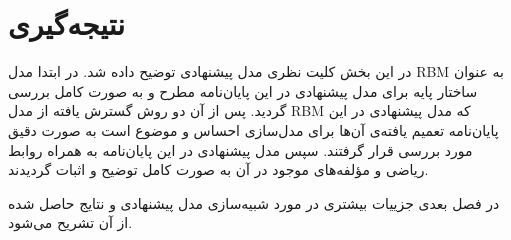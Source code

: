 \section{نتیجه‌گیری}
در این بخش کلیت نظری مدل پیشنهادی توضیح داده شد. در ابتدا مدل
RBM
به عنوان ساختار پایه برای مدل پیشنهادی در این پایان‌‌نامه مطرح و به صورت کامل بررسی‌ گردید. پس از آن دو روش گسترش یافته از مدل
RBM
که مدل پیشنهادی در این پایان‌‌نامه تعمیم یافته‌ی ‌آن‌ها برای مدل‌سازی احساس و موضوع است به صورت دقیق مورد بررسی‌ قرار گرفتند. سپس مدل پیشنهادی در این پایان‌‌نامه به همراه روابط ریاضی‌ و مؤلفه‌های موجود در آن به صورت کامل توضیح و اثبات گردیدند.

در فصل بعدی جزییات بیشتری در مورد شبیه‌سازی مدل‌ پیشنهادی و نتایج حاصل شده از آن تشریح می‌شود.






